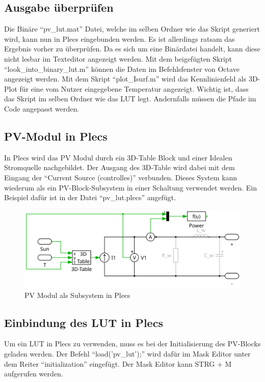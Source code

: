 \documentclass[a4paper,11pt,oneside]{article}
\begin{document}
		\subsection{Ausgabe überprüfen}
			Die Binäre \enquote{pv\_lut.mat} Datei, welche im selben Ordner wie das Skript generiert wird, kann nun in Plecs eingebunden werden. Es ist allerdings ratsam das Ergebnis vorher zu überprüfen. Da es sich um eine Binärdatei handelt, kann diese nicht lesbar im Texteditor angezeigt werden. Mit dem beigefügten Skript \enquote{look\_into\_binary\_lut.m} können die Daten im Befehlsfenster von Octave angezeigt werden. Mit dem Skript \enquote{plot\_Isurf.m} wird das Kennlinienfeld als 3D-Plot für eine vom Nutzer eingegebene Temperatur angezeigt. Wichtig ist, dass das Skript im selben Ordner wie das LUT legt. Andernfalls müssen die Pfade im Code angepasst werden.
		
		\subsection{PV-Modul in Plecs}
			In Plecs wird das PV Modul durch ein 3D-Table Block und einer Idealen Stromquelle nachgebildet. Der Ausgang des 3D-Table wird dabei mit dem Eingang der \enquote{Current Source (controlles)} verbunden. Dieses System kann wiederum als ein PV-Block-Subsystem in einer Schaltung verwendet werden. Ein Beispiel dafür ist in der Datei \enquote{pv\_lut.plecs} angefügt.
			\begin{figure}[H]
				\centering
				\includegraphics[width=0.7\linewidth]{PV_string}
				\caption{PV Modul als Subsystem in Plecs}
				\label{fig:pvstring}
			\end{figure}
			
		
		\subsection{Einbindung des LUT in Plecs}
			Um ein LUT in Plecs zu verwenden, muss es bei der Initialisierung des PV-Blocks geladen werden. Der Befehl \enquote{load('pv\_lut');} wird dafür im Mask Editor unter dem Reiter \enquote{initialization} eingefügt. Der Mask Editor kann STRG + M aufgerufen werden.\\
			
\end{document}

